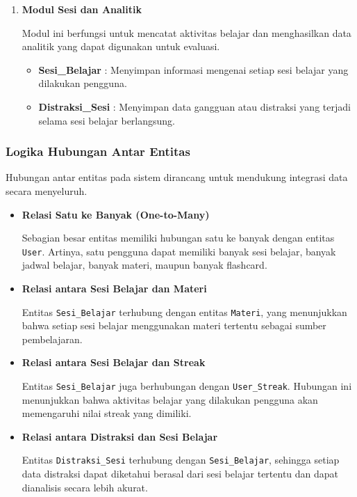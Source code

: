 \documentclass[11pt]{article}
\begin{document}
\begin{enumerate}
\item \textbf{Modul Sesi dan Analitik}

Modul ini berfungsi untuk mencatat aktivitas belajar dan menghasilkan data analitik yang dapat digunakan untuk evaluasi.

\begin{itemize}
\item \textbf{Sesi\_Belajar} : Menyimpan informasi mengenai setiap sesi belajar yang dilakukan pengguna.
\item \textbf{Distraksi\_Sesi} : Menyimpan data gangguan atau distraksi yang terjadi selama sesi belajar berlangsung.
\end{itemize}

\end{enumerate}

\subsubsection{Logika Hubungan Antar Entitas}

Hubungan antar entitas pada sistem dirancang untuk mendukung integrasi data secara menyeluruh.

\begin{itemize}

\item \textbf{Relasi Satu ke Banyak (One-to-Many)}

Sebagian besar entitas memiliki hubungan satu ke banyak dengan entitas \texttt{User}. Artinya, satu pengguna dapat memiliki banyak sesi belajar, banyak jadwal belajar, banyak materi, maupun banyak flashcard.

\item \textbf{Relasi antara Sesi Belajar dan Materi}

Entitas \texttt{Sesi\_Belajar} terhubung dengan entitas \texttt{Materi}, yang menunjukkan bahwa setiap sesi belajar menggunakan materi tertentu sebagai sumber pembelajaran.

\item \textbf{Relasi antara Sesi Belajar dan Streak}

Entitas \texttt{Sesi\_Belajar} juga berhubungan dengan \texttt{User\_Streak}. Hubungan ini menunjukkan bahwa aktivitas belajar yang dilakukan pengguna akan memengaruhi nilai streak yang dimiliki.

\item \textbf{Relasi antara Distraksi dan Sesi Belajar}

Entitas \texttt{Distraksi\_Sesi} terhubung dengan \texttt{Sesi\_Belajar}, sehingga setiap data distraksi dapat diketahui berasal dari sesi belajar tertentu dan dapat dianalisis secara lebih akurat.

\end{itemize}
\end{document}
